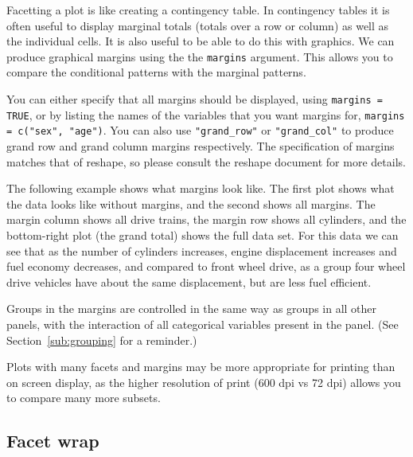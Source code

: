 Facetting a plot is like creating a contingency table.  In contingency tables it is often useful to display marginal totals (totals over a row or column) as well as the individual cells.  It is also useful to be able to do this with graphics.  We can produce graphical margins using the the {\tt margins} argument.  This allows you to compare the conditional patterns with the marginal patterns.

You can either specify that all margins should be displayed, using {\tt margins = TRUE}, or by listing the names of the variables that you want margins for, {\tt margins = c("sex", "age")}.  You can also use \verb|"grand_row"| or \verb|"grand_col"| to produce grand row and grand column margins respectively.  The specification of margins matches that of reshape, so please consult the reshape document for more details.

The following example shows what margins look like.  The first plot shows what the data looks like without margins, and the second shows all margins.  The margin column shows all drive trains, the margin row shows all cylinders, and the bottom-right plot (the grand total) shows the full data set.  For this data we can see that as the number of cylinders increases, engine displacement increases and fuel economy decreases, and compared to front wheel drive, as a group four wheel drive vehicles have about the same displacement, but are less fuel efficient.

% 


Groups in the margins are controlled in the same way as groups in all other panels, with the interaction of all categorical variables present in the panel.  (See Section~\ref{sub:grouping} for a reminder.)

% 


Plots with many facets and margins may be more appropriate for printing than on screen display, as the higher resolution of print (600 dpi vs 72 dpi) allows you to compare many more subsets.

\subsection{Facet wrap}
\label{sub:facet_wrap}

